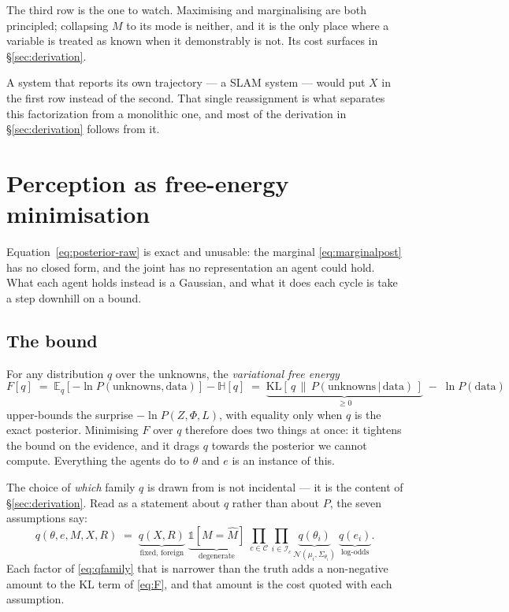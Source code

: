 \documentclass[11pt,a4paper]{report}
\newcommand{\given}{\,|\,}
\theoremstyle{definition}   %
\begin{document}
\noindent
The third row is the one to watch. Maximising and marginalising are both principled; collapsing
$M$ to its mode is neither, and it is the only place where a variable is treated as known when it
demonstrably is not. Its cost surfaces in \S\ref{sec:derivation}.

A system that reports its own trajectory --- a SLAM system --- would put $X$ in the first row
instead of the second. That single reassignment is what separates this factorization from a
monolithic one, and most of the derivation in \S\ref{sec:derivation} follows from it.

\section{Perception as free-energy minimisation}
\label{sec:fe}

Equation~\eqref{eq:posterior-raw} is exact and unusable: the marginal
\eqref{eq:marginalpost} has no closed form, and the joint has no representation an agent could
hold. What each agent holds instead is a Gaussian, and what it does each cycle is take a step
downhill on a bound.

\subsection{The bound}

For any distribution $q$ over the unknowns, the \emph{variational free energy}
\begin{equation}
F[q]\;=\;\mathbb{E}_{q}\!\left[-\ln P(\text{unknowns},\text{data})\right]-\mathbb{H}[q]
\;=\;\underbrace{\mathrm{KL}\!\left[\,q\,\|\,P(\text{unknowns}\given\text{data})\,\right]}_{\ge 0}
\;-\;\ln P(\text{data})
\label{eq:F}
\end{equation}
upper-bounds the surprise $-\ln P(Z,\Phi,L)$, with equality only when $q$ is the exact posterior.
Minimising $F$ over $q$ therefore does two things at once: it tightens the bound on the evidence,
and it drags $q$ towards the posterior we cannot compute. Everything the agents do to $\theta$ and
$e$ is an instance of this.

The choice of \emph{which} family $q$ is drawn from is not incidental --- it is the content of
\S\ref{sec:derivation}. Read as a statement about $q$ rather than about $P$, the seven assumptions
say:
\begin{equation}
q\!\left(\theta,e,M,X,R\right)\;=\;
\underbrace{q(X,R)}_{\text{fixed, foreign}}\;
\underbrace{\mathbb{1}\!\left[M=\hat M\right]}_{\text{degenerate}}\;
\prod_{c\in\mathcal{C}}\prod_{i\in\mathcal{I}_c}
\underbrace{q(\theta_i)}_{\mathcal{N}(\mu_i,\Sigma_{\theta_i})}\;
\underbrace{q(e_i)}_{\text{log-odds}} .
\label{eq:qfamily}
\end{equation}
Each factor of \eqref{eq:qfamily} that is narrower than the truth adds a non-negative amount to the
KL term of \eqref{eq:F}, and that amount is the cost quoted with each assumption.
\end{document}
